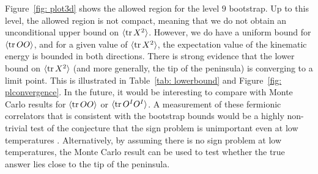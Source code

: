\documentclass[11pt]{article}
\renewcommand{\ev}[1]{\langle #1 \rangle} %
\begin{document}
Figure~\ref{fig: plot3d} shows the allowed region for the level $9$ bootstrap. Up to this level, the allowed region is not compact, meaning that we do not obtain an unconditional upper bound on $\langle \tr X^2 \rangle$. However, we do have a uniform bound for $\langle \tr O O \rangle$, and for a given value of $\langle \tr X^2 \rangle$, the expectation value of the kinematic energy is bounded in both directions. There is strong evidence that the lower bound on $\langle \tr X^2 \rangle$ (and more generally, the tip of the peninsula) is converging to a limit point. This is illustrated in Table~\ref{tab: lowerbound} and Figure~\ref{fig: plconvergence}. In the future, it would be interesting to compare with Monte Carlo results for $\ev{\tr OO}$ or $\ev{\tr O^I O^I}$. A measurement of these fermionic correlators that is consistent with the bootstrap bounds would be a highly non-trivial test of the conjecture that the sign problem is unimportant even at low temperatures \cite{Catterall:2008yz, Catterall:2009xn, Berkowitz:2016jlq}. Alternatively, by assuming there is no sign problem at low temperatures, the Monte Carlo result can be used to test whether the true answer lies close to the tip of the peninsula.
\end{document}
